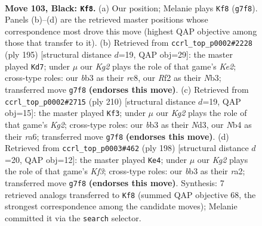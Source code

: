 \documentclass[11pt]{article}
\begin{document}
\clearpage

\begin{figure}[p]\centering
\begin{subfigure}{0.46\textwidth}\centering
\resizebox{\linewidth}{!}{%
\newchessgame
\chessboard[
  setfen={8/5pk1/6p1/4P3/1n3P2/1B4p1/5r2/7K b - - 5 103},
  showmover=false,
  pgfstyle=straightmove, color=movearrow, markmove={g7-f8}
]}
\caption{}
\end{subfigure}\hfill
\begin{subfigure}{0.46\textwidth}\centering
\resizebox{\linewidth}{!}{%
\newchessgame
\chessboard[
  setfen={2R5/4k3/2p1p3/2PpP3/8/1n2K3/8/8 b - - 85 98},
  showmover=false,
  pgfstyle=straightmove, color=movearrow, markmove={e7-d7}
]}
\caption{}
\end{subfigure}
\\[4pt]
\begin{subfigure}{0.46\textwidth}\centering
\resizebox{\linewidth}{!}{%
\newchessgame
\chessboard[
  setfen={6k1/1R6/r2b2p1/7p/7P/3N2P1/5PK1/8 w - - 69 106},
  showmover=false,
  pgfstyle=straightmove, color=movearrow, markmove={g2-f3}
]}
\caption{}
\end{subfigure}\hfill
\begin{subfigure}{0.46\textwidth}\centering
\resizebox{\linewidth}{!}{%
\newchessgame
\chessboard[
  setfen={8/5p1k/3R3p/7P/5PP1/5K2/r7/8 w - - 5 100},
  showmover=false,
  pgfstyle=straightmove, color=movearrow, markmove={f3-e4}
]}
\caption{}
\end{subfigure}
\caption{\textbf{Move 103, Black: \texttt{Kf8}.} (a) Our position; Melanie plays \texttt{Kf8} (\texttt{g7f8}). Panels (b)--(d) are the retrieved master positions whose correspondence most drove this move (highest QAP objective among those that transfer to it). (b) Retrieved from \texttt{ccrl\_top\_p0002\#2228} (ply 195) [structural distance $d$=19, QAP obj=29]: the master played \texttt{Kd7}; under $\mu$ our \emph{Kg2} plays the role of that game's \emph{Ke2}; cross-type roles: our \emph{b}b3 as their \emph{r}c8, our \emph{R}f2 as their \emph{N}b3; transferred move \texttt{g7f8} \textbf{(endorses this move)}. (c) Retrieved from \texttt{ccrl\_top\_p0002\#2715} (ply 210) [structural distance $d$=19, QAP obj=15]: the master played \texttt{Kf3}; under $\mu$ our \emph{Kg2} plays the role of that game's \emph{Kg2}; cross-type roles: our \emph{b}b3 as their \emph{N}d3, our \emph{N}b4 as their \emph{r}a6; transferred move \texttt{g7f8} \textbf{(endorses this move)}. (d) Retrieved from \texttt{ccrl\_top\_p0003\#462} (ply 198) [structural distance $d$=20, QAP obj=12]: the master played \texttt{Ke4}; under $\mu$ our \emph{Kg2} plays the role of that game's \emph{Kf3}; cross-type roles: our \emph{b}b3 as their \emph{r}a2; transferred move \texttt{g7f8} \textbf{(endorses this move)}. Synthesis: 7 retrieved analogs transferred to \texttt{Kf8} (summed QAP objective 68, the strongest correspondence among the candidate moves); Melanie committed it via the \texttt{search} selector.}
\label{fig:thought-m205}
\end{figure}
\end{document}
